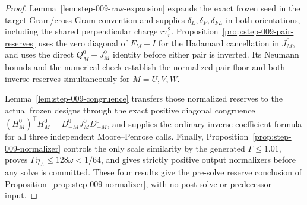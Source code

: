 \begin{proof}
Lemma~\ref{lem:step-009-raw-expansion} expands the exact frozen seed in the
target Gram/cross-Gram convention and supplies \(\delta_L,\delta_F,\delta_{FL}\)
in both orientations, including the shared perpendicular charge
\(r\tau_r^2\). Proposition~\ref{prop:step-009-pair-reserves} uses the zero
diagonal of \(F_M-I\) for the Hadamard cancellation in \(J_M^0\), and uses
the direct \(Q_M^0-J_M^0\) identity before either pair is inverted. Its
Neumann bounds and the numerical check establish the normalized pair floor
and both inverse reserves simultaneously for \(M=U,V,W\).

Lemma~\ref{lem:step-009-congruence} transfers those normalized reserves to the
actual frozen designs through the exact positive diagonal congruence
\((H_M^0)^\top H_M^0=D_{-M}^0J_M^0D_{-M}^0\), and supplies the
ordinary-inverse coefficient formula for all three independent Moore--Penrose
calls. Finally, Proposition~\ref{prop:step-009-normalizer} controls the only
scale similarity by the generated \(\Gamma\le1.01\), proves
\(\Gamma\eta_A\le128\omega<1/64\), and gives strictly positive output
normalizers before any solve is committed. These four results give the
pre-solve reserve conclusion of Proposition~\ref{prop:step-009-normalizer},
with no post-solve or predecessor input.
\end{proof}

